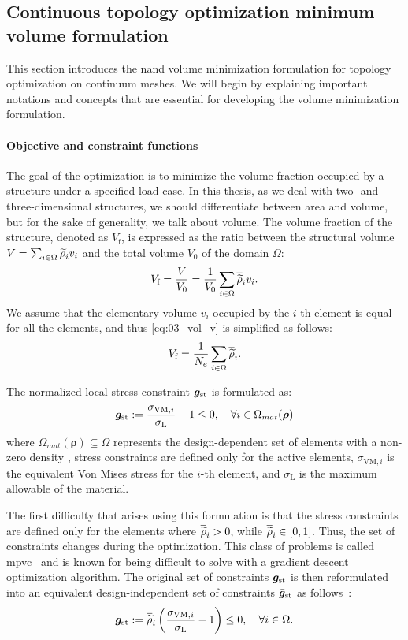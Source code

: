 \subsection{Continuous topology optimization minimum volume formulation}
This section introduces the \gls{nand} volume minimization formulation for topology optimization on continuum meshes. We will begin by explaining important notations and concepts that are essential for developing the volume minimization formulation.
\paragraph{Objective and constraint functions}
The goal of the optimization is to minimize the volume fraction occupied by a structure under a specified load case. In this thesis, as we deal with two- and three-dimensional structures, we should differentiate between area and volume, but for the sake of generality, we talk about volume. The volume fraction of the structure, denoted as $V_\text{f}$, is expressed as the ratio between the structural volume $V=\sum_{i \in \Omega} \overline{\widetilde{\rho}}_i v_i$ and the total volume $V_0$ of the domain $\Omega$:
\begin{equation}
    V_\text{f} = \frac{V}{V_0} = \frac{1}{V_0}\sum_{i \in \Omega} \overline{\widetilde{\rho}}_i v_i.
    \label{eq:03_vol_v}
\end{equation}
We assume that the elementary volume $v_i$ occupied by the $i$-th element is equal for all the elements, and thus \eqref{eq:03_vol_v} is simplified as follows:
\begin{equation}
    V_\text{f} = \frac{1}{N_{e}} \sum_{i \in \Omega} \overline{\widetilde{\rho}}_i. 
    \label{eq:03_obj_vol}  
\end{equation}

The normalized local stress constraint $\bm{g}_{\text{st}}$ is formulated as:
\begin{equation}
    \bm{g}_{\text{st}}:=\frac{\sigma_{\text{VM},i}}{\sigma_\text{L}}-1 \leq 0, \quad \forall i \in \Omega_{mat}(\bm{\rho})
\end{equation}
where $\Omega_{mat}(\bm{\rho}) \subseteq \Omega$ represents the design-dependent set of elements with a non-zero density \ie, stress constraints are defined only for the active elements, $\sigma_{\text{VM},i}$ is the equivalent Von Mises stress for the $i$-th element, and $\sigma_\text{L}$ is the maximum allowable of the material.

The first difficulty that arises using this formulation is that the stress constraints are defined only for the elements where $\overline{\widetilde{\rho}}_i > 0$, while $\overline{\widetilde{\rho}}_i\in[0,1]$. Thus, the set of constraints changes during the optimization. This class of problems is called \acrfull{mpvc}~ and is known for being difficult to solve with a gradient descent optimization algorithm. The original set of constraints $\bm{g}_{\text{st}}$ is then reformulated into an equivalent design-independent set of constraints $\bar{\bm{g}}_{\text{st}}$ as follows~:
\begin{equation}
    \bar{\bm{g}}_{\text{st}}:=\overline{\widetilde{\rho}}_i\left(\frac{ \sigma_{\text{VM},i}}{\sigma_\text{L}}-1 \right) \leq 0, \quad \forall i \in \Omega.
\end{equation}
